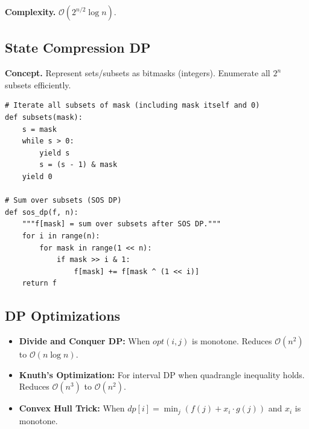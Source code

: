\documentclass[10pt,a4paper]{article}
\theoremstyle{cpstyle}
\newcommand{\bigO}[1]{\mathcal{O}\!\left(#1\right)}
\begin{document}
\textbf{Complexity.} $\bigO{2^{n/2} \log n}$.

\subsection{State Compression DP}

\textbf{Concept.} Represent sets/subsets as bitmasks (integers). Enumerate all $2^n$ subsets efficiently.

\begin{lstlisting}[caption={Subset enumeration -- iterate all subsets of a mask}]
# Iterate all subsets of mask (including mask itself and 0)
def subsets(mask):
    s = mask
    while s > 0:
        yield s
        s = (s - 1) & mask
    yield 0

# Sum over subsets (SOS DP)
def sos_dp(f, n):
    """f[mask] = sum over subsets after SOS DP."""
    for i in range(n):
        for mask in range(1 << n):
            if mask >> i & 1:
                f[mask] += f[mask ^ (1 << i)]
    return f
\end{lstlisting}

\subsection{DP Optimizations}

\begin{itemize}[noitemsep]
  \item \textbf{Divide and Conquer DP:} When $opt(i,j)$ is monotone. Reduces $\bigO{n^2}$ to $\bigO{n \log n}$.
  \item \textbf{Knuth's Optimization:} For interval DP when quadrangle inequality holds. Reduces $\bigO{n^3}$ to $\bigO{n^2}$.
  \item \textbf{Convex Hull Trick:} When $dp[i] = \min_j (f(j) + x_i \cdot g(j))$ and $x_i$ is monotone.
\end{itemize}
\end{document}
